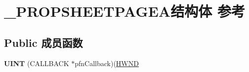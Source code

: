 \hypertarget{struct___p_r_o_p_s_h_e_e_t_p_a_g_e_a}{}\section{\+\_\+\+P\+R\+O\+P\+S\+H\+E\+E\+T\+P\+A\+G\+E\+A结构体 参考}
\label{struct___p_r_o_p_s_h_e_e_t_p_a_g_e_a}
\subsection*{Public 成员函数}
\begin{DoxyCompactItemize}
\item 
\mbox{\label{struct___p_r_o_p_s_h_e_e_t_p_a_g_e_a_a9a95fea08a651e93daba202998d3561f}} 
{\bfseries U\+I\+NT} (C\+A\+L\+L\+B\+A\+CK $\ast$pfn\+Callback)(\hyperlink{interfacevoid}{H\+W\+ND}
\end{DoxyCompactItemize}
